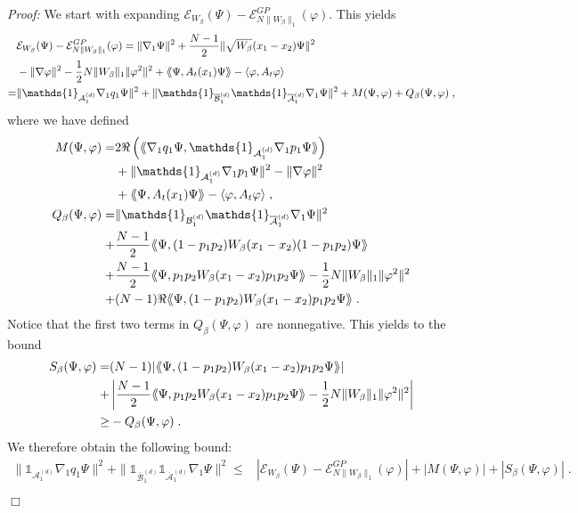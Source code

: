 \documentclass[11pt, english, american]{article}
\newcommand{\laa}{\langle\hspace{-0.08cm}\langle}
\newcommand{\raa}{\rangle\hspace{-0.08cm}\rangle}
\newenvironment{proof}{\emph{Proof:}}{\begin{flushright} $ \Box $ \end{flushright}}
\renewcommand{\phi}{\varphi}
\begin{document}
\begin{proof}
We start with expanding $\mathcal{E}_{W_\beta}(\Psi)-\mathcal{E}_{N \|W_\beta\|_1}^{GP}(\phi)$. This yields 
\begin{align*}
&\mathcal{E}_{W_\beta}(\Psi)-\mathcal{E}_{N \|W_\beta\|_1}^{GP}(\phi)
=
\|\nabla_1\Psi \|^2+\frac{N-1}{2}\|\sqrt{W_\beta}(x_1-x_2)\Psi\|^2
\nonumber
\\&
-\|\nabla\phi \|^2-\frac{1}{2} N\|W_\beta\|_1 \|\phi^2\|^2+
\laa \Psi, A_t (x_1) \Psi \raa - \langle \phi, A_t \phi \rangle
\nonumber
\\=&
 \|\mathds{1}_{\mathcal{A}^{(d)}_{1}}\nabla_1q_1\Psi \|^2+\|\mathds{1}_{\overline{\mathcal{B}}^{(d)}_{1}}
\mathds{1}_{\overline{\mathcal{A}}^{(d)}_{1}}
\nabla_1\Psi \|^2
+
M( \Psi, \phi)+Q_\beta( \Psi, \phi)
\;,
\end{align*}
where we have defined
\begin{align}
M( \Psi, \phi)=
\label{1 term in M}
&2 \Re\left(\laa\nabla_1q_1\Psi ,
\mathds{1}_{\mathcal{A}^{(d)}_{1}}
\nabla_1p_1\Psi \raa\right)
\\&
\label{2 term in M}
+ \|\mathds{1}_{\mathcal{A}^{(d)}_{1}}\nabla_1p_1\Psi \|^2-\|\nabla\phi \|^2
\\&
\label{3 term in M}
+\laa\Psi , A_t(x_1)\Psi\raa-\langle\phi , A_t\phi\rangle
\;,
\\
\nonumber
Q_\beta( \Psi, \phi)=&
\|\mathds{1}_{\mathcal{B}^{(d)}_{1}}\mathds{1}_{\overline{\mathcal{A}}^{(d)}_{1}}\nabla_1\Psi \|^2
\\
\nonumber
+&
\frac{N-1}{2}\laa\Psi ,(1-p_1p_2)W_{\beta}(x_1-x_2)(1-p_1p_2)\Psi\raa
\\
\nonumber
+&\frac{N-1}{2}\laa\Psi ,p_1p_2W_{\beta}(x_1-x_2)p_1p_2\Psi\raa -\frac{1}{2}N\|W_\beta\|_1\|\phi^2\|^2
\\
\nonumber
+&(N-1)\Re\laa\Psi ,(1-p_1p_2)W_{\beta}(x_1-x_2)p_1p_2\Psi\raa
\;.
\end{align}
Notice that the first two terms in $Q_\beta( \Psi, \phi)$ are nonnegative. This yields to the bound
\begin{align}
S_\beta( \Psi, \phi)=&
\label{1-pp term in Sbeta}
(N-1)|\laa\Psi ,(1-p_1p_2)W_{\beta}(x_1-x_2)p_1p_2\Psi\raa |
\\
+&
\label{pp pq term in Sbeta}
\left|
\frac{N-1}{2}\laa\Psi ,p_1p_2W_{\beta}(x_1-x_2)p_1p_2\Psi\raa -\frac{1}{2}N\|W_\beta\|_1\|\phi^2\|^2
\right|
\\
\nonumber
\geq&
-Q_\beta( \Psi, \phi)
\;.
\end{align}
We therefore obtain the following bound:
\begin{align}
\label{firsteneergybound}
 \|\mathds{1}_{\mathcal{A}^{(d)}_{1}}\nabla_1q_1\Psi \|^2
 +
 \|\mathds{1}_{\overline{\mathcal{B}}^{(d)}_{1}}
\mathds{1}_{\overline{\mathcal{A}}^{(d)}_{1}}
\nabla_1\Psi \|^2
\leq
&
\left|
\mathcal{E}_{W_\beta}(\Psi)-\mathcal{E}_{N \|W_\beta\|_1}^{GP}(\phi)
\right|
+
|M( \Psi, \phi)|+|S_\beta( \Psi, \phi)|
\;.
\end{align}





\end{proof}
\end{document}
